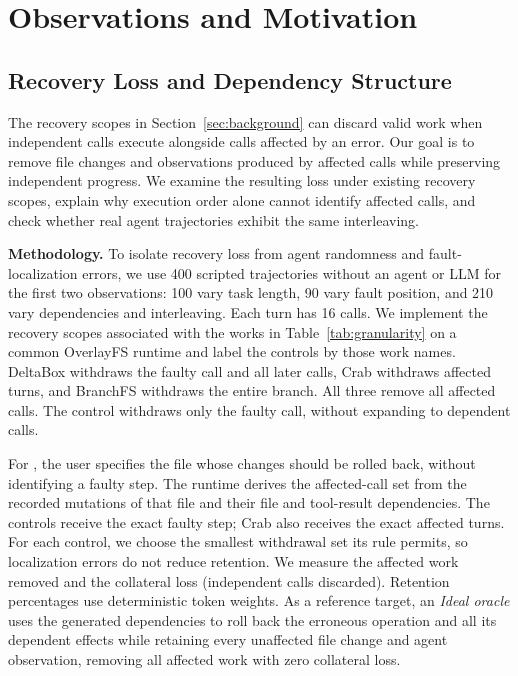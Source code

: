 \section{Observations and Motivation}
\label{sec:motivation}

\subsection{Recovery Loss and Dependency Structure}
\label{sec:motivation-observations}

The recovery scopes in Section~\ref{sec:background} can discard valid work
when independent calls execute alongside calls affected by an error.
Our goal is to remove file changes and observations produced by affected calls
while preserving independent progress. We examine the resulting loss under
existing recovery scopes, explain why execution order alone cannot identify
affected calls, and check whether real agent trajectories exhibit the same
interleaving.

\textbf{Methodology.}
To isolate recovery loss from agent randomness and fault-localization
errors, we use 400 scripted trajectories without an agent or LLM for the
first two observations: 100 vary task length, 90 vary fault position, and
210 vary dependencies and interleaving. Each turn has 16 calls. We implement
the recovery scopes associated with the works in Table~\ref{tab:granularity}
on a common OverlayFS runtime and label the controls by those work names.
DeltaBox withdraws the faulty call and all later calls, Crab withdraws
affected turns, and BranchFS withdraws the entire branch. All three remove
all affected calls. The \trycmd control withdraws only the faulty call,
without expanding to dependent calls.

For \system, the user specifies the file whose changes should be rolled
back, without identifying a faulty step. The runtime derives the
affected-call set from the recorded mutations of that file and their file
and tool-result dependencies. The controls receive the exact faulty step; Crab
also receives the exact affected turns. For each control, we choose the
smallest withdrawal set its rule permits, so localization errors do not
reduce retention. We measure the affected work removed and the collateral
loss (independent calls discarded). Retention percentages use deterministic
token weights. As a reference target, an \emph{Ideal oracle} uses the
generated dependencies to roll back the erroneous operation and all its
dependent effects while retaining every unaffected file change and agent
observation, removing all affected work with zero collateral loss.

